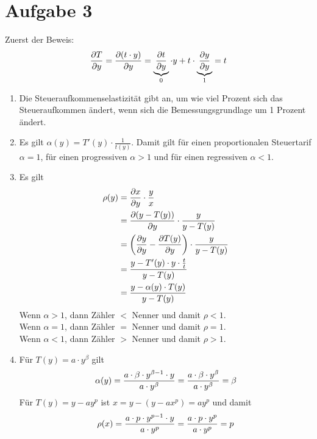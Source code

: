 \documentclass{article}
\begin{document}
	\section*{Aufgabe 3}
	Zuerst der Beweis:
	\begin{align}
		\frac{\partial T}{\partial y} = \frac{\partial (t\cdot y)}{\partial y} = \underbrace{\frac{\partial t}{\partial y}}_{0}\cdot y + t\cdot\underbrace{\frac{\partial y}{\partial y}}_{1} = t \notag
	\end{align}
	\begin{enumerate}[label=(\alph*)]
		\item Die Steueraufkommenselastizität gibt an, um wie viel Prozent sich das Steueraufkommen ändert, wenn sich die Bemessungsgrundlage um 1 Prozent ändert.
		\item Es gilt $\alpha(y)=T'(y)\cdot \frac{1}{t(y)}$. Damit gilt für einen proportionalen Steuertarif $\alpha=1$, für einen progressiven $\alpha>1$ und für einen regressiven $\alpha<1$.
		\item Es gilt
		\begin{align}
			\rho(y) &= \frac{\partial x}{\partial y} \cdot\frac{y}{x} \notag \\
			&= \frac{\partial (y-T(y))}{\partial y} \cdot\frac{y}{y-T(y)} \notag \\
			&= \left(\frac{\partial y}{\partial y} - \frac{\partial T(y)}{\partial y}\right)\cdot\frac{y}{y-T(y)} \notag \\
			&= \frac{y-T'(y)\cdot y\cdot\frac{t}{t}}{y-T(y)} \notag \\
			&= \frac{y-\alpha(y)\cdot T(y)}{y-T(y)} \notag
		\end{align}
		Wenn $\alpha>1$, dann Zähler $<$ Nenner und damit $\rho<1$. \\
		Wenn $\alpha=1$, dann Zähler $=$ Nenner und damit $\rho=1$. \\
		Wenn $\alpha<1$, dann Zähler $>$ Nenner und damit $\rho>1$.
		\item Für $T(y)=a\cdot y^\beta$ gilt
		\begin{align}
			\alpha(y) = \frac{a\cdot\beta\cdot y^{\beta-1}\cdot y}{a\cdot y^\beta} = \frac{a\cdot\beta\cdot y^\beta}{a\cdot y^\beta} = \beta \notag
		\end{align}
		Für $T(y)=y-ay^p$ ist $x=y-(y-ax^p)=ay^p$ und damit
		\begin{align}
			\rho(x) = \frac{a\cdot p\cdot y^{p-1}\cdot y}{a\cdot y^p} = \frac{a\cdot p\cdot y^p}{a\cdot y^p} = p \notag
		\end{align}
	\end{enumerate}
\end{document}
